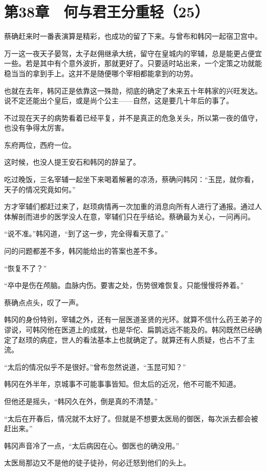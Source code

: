 \section{第38章　何与君王分重轻（25）}

蔡确赶来时一番表演算是精彩，也成功的留了下来。与曾布和韩冈一起宿卫宫中。

万一这一夜天子晏驾，太子赵佣继承大统，留守在皇城内的宰辅，总是能更占便宜一些。若是其中有个意外波折，那就更好了。只要适时站出来，一个定策之功就能稳当当的拿到手上。这并不是随便哪个宰相都能拿到的功劳。

也就在去年，韩冈正是依靠这一殊勋，彻底的确定了未来五十年韩家的兴旺发达。说不定还能出个皇后，或是尚个公主——自然，这是要几十年后的事了。

不过现在天子的病势看着已经平复，并不是真正的危急关头，所以第一夜的值守，也没有争得太厉害。

东府两位，西府一位。

这时候，也没人提王安石和韩冈的辞呈了。

吃过晚饭，三名宰辅一起坐下来喝着解暑的凉汤，蔡确问韩冈：“玉昆，就你看，天子的情况究竟如何。”

方才宰辅们都赶过来了，赵顼病情再一次加重的消息向所有人进行了通报。通过人体解剖而进步的医学没人在意，宰辅们只在乎结论。蔡确最为关心，一问再问。

“说不准。”韩冈道，“到了这一步，完全得看天意了。”

问的问题都差不多，韩冈能给出的答案也差不多。

“恢复不了？”

“卒中是伤在颅脑。血脉内伤。要害之处，伤势很难恢复。只能慢慢将养着。”

蔡确点点头，叹了一声。

韩冈的身份特别，宰辅之外，还有一层医道圣贤的光环。就算不信什么药王弟子的谬说，可韩冈他在医道上的成就，也是华佗、扁鹊远远不能及的。韩冈既然已经确定了赵顼的病症，世人的看法基本上也就确定了。就算还有人质疑，也占不了主流。

“太后的情况似乎不是很好。”曾布忽然说道，“玉昆可知？”

韩冈在外半年，京城事不可能事事皆知。但太后的近况，他不可能不知道。

但他还是摇头，“韩冈久在外，倒是真的不清楚。”

“太后在开春后，情况就不太好了。但就是不想要太医局的御医，每次派去都会被赶出来。”

韩冈声音冷了一点，“太后病因在心。御医也的确没用。”

太医局那边又不是他的徒子徒孙，何必迁怒到他们的头上。

